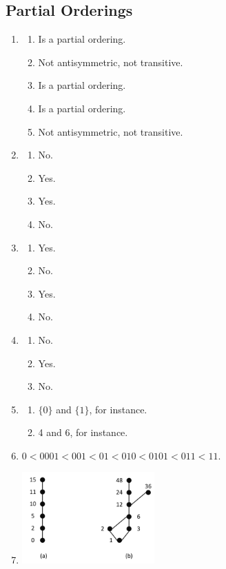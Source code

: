 \documentclass{../../cls/sig-alternate-05-2015}
\begin{document}
\subsection{Partial Orderings}
\begin{enumerate}
\item 
\begin{enumerate}
	\item Is a partial ordering.
	\item Not antisymmetric, not transitive.
	\item Is a partial ordering.
	\item Is a partial ordering.
	\item Not antisymmetric, not transitive.
\end{enumerate}

\item 
\begin{enumerate}
	\item No.
	\item Yes.
	\item Yes.
	\item No.
\end{enumerate}

\item 
\begin{enumerate}
	\item Yes.
	\item No.
	\item Yes.
	\item No.
\end{enumerate}

\item 
\begin{enumerate}
	\item No.
	\item Yes.
	\item No.
\end{enumerate}

\item 
\begin{enumerate}
	\item $\{0\}$ and $\{1\}$, for instance.
	\item 4 and 6, for instance.
\end{enumerate}

\item $0 < 0001 < 001 < 01 < 010 < 0101 < 011 < 11$.

\item 
	\includegraphics[width=0.4\textwidth]{figs/252.pdf}
	

\end{enumerate}
\end{document}
